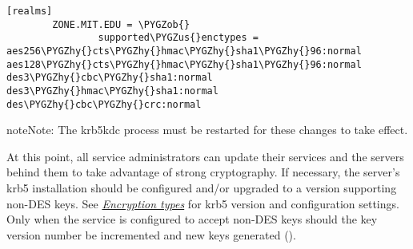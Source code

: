 \documentclass[letterpaper,10pt,english]{sphinxmanual}
\def\PYGZus{\char`\_}
\def\PYGZob{\char`\{}
\def\PYGZhy{\char`\-}
\begin{document}
\begin{Verbatim}[commandchars=\\\{\}]
[realms]
        ZONE.MIT.EDU = \PYGZob{}
                supported\PYGZus{}enctypes = aes256\PYGZhy{}cts\PYGZhy{}hmac\PYGZhy{}sha1\PYGZhy{}96:normal aes128\PYGZhy{}cts\PYGZhy{}hmac\PYGZhy{}sha1\PYGZhy{}96:normal des3\PYGZhy{}cbc\PYGZhy{}sha1:normal des3\PYGZhy{}hmac\PYGZhy{}sha1:normal des\PYGZhy{}cbc\PYGZhy{}crc:normal
\end{Verbatim}

\begin{notice}{note}{Note:}
The krb5kdc process must be restarted for these changes to take effect.
\end{notice}

At this point, all service administrators can update their services and the
servers behind them to take advantage of strong cryptography.
If necessary, the server's krb5 installation should be configured and/or
upgraded to a version supporting non-DES keys.  See {\hyperref[admin/enctypes:enctypes]{\emph{Encryption types}}} for
krb5 version and configuration settings.
Only when the service is configured to accept non-DES keys should
the key version number be incremented and new keys generated
().
\end{document}

